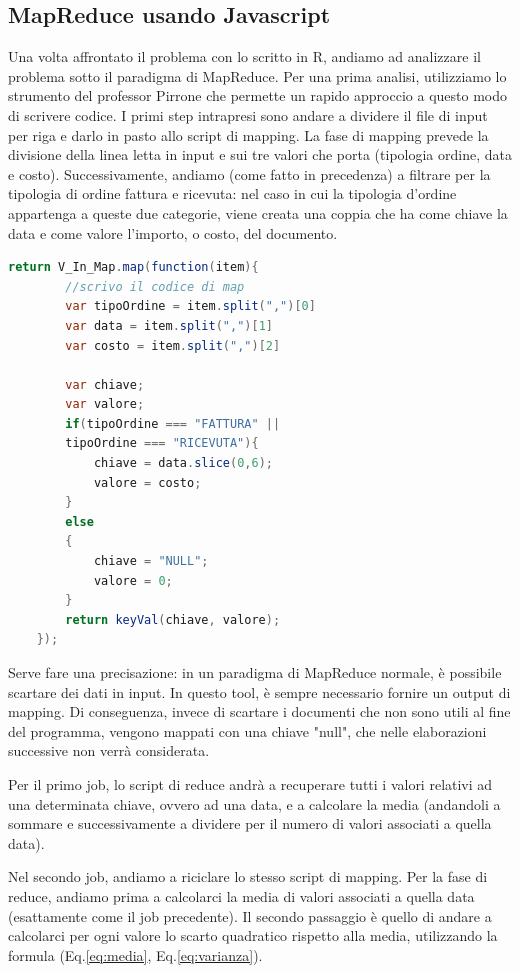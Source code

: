 \subsection{MapReduce usando Javascript}
Una volta affrontato il problema con lo scritto in R, andiamo ad analizzare il problema sotto il paradigma di MapReduce. Per una prima analisi, utilizziamo lo strumento del professor Pirrone che permette un rapido approccio a questo modo di scrivere codice. I primi step intrapresi sono andare a dividere il file di input per riga e darlo in pasto allo script di mapping.
La fase di mapping prevede la divisione della linea letta in input e sui tre valori che porta (tipologia ordine, data e costo). Successivamente, andiamo (come fatto in precedenza) a filtrare per la tipologia di ordine fattura e ricevuta: nel caso in cui la tipologia d'ordine appartenga a queste due categorie, viene creata una coppia che ha come chiave la data e come valore l'importo, o costo, del documento.


\begin{lstlisting}[language=Java, caption={Script di mapping}]
    return V_In_Map.map(function(item){
        //scrivo il codice di map
        var tipoOrdine = item.split(",")[0]
        var data = item.split(",")[1]
        var costo = item.split(",")[2]

        var chiave;
        var valore;
        if(tipoOrdine === "FATTURA" ||
        tipoOrdine === "RICEVUTA"){
            chiave = data.slice(0,6);
            valore = costo;
        }
        else
        {
            chiave = "NULL";
            valore = 0;
        }
        return keyVal(chiave, valore);
    });

\end{lstlisting}
Serve fare una precisazione: in un paradigma di MapReduce normale, è possibile scartare dei dati in input. In questo tool, è sempre necessario fornire un output di mapping. Di conseguenza, invece di scartare i documenti che non sono utili al fine del programma, vengono mappati con una chiave "null", che nelle elaborazioni successive non verrà considerata.

Per il primo job, lo script di reduce andrà a recuperare tutti i valori relativi ad una determinata chiave, ovvero ad una data, e a calcolare la media (andandoli a sommare e successivamente a dividere per il numero di valori associati a quella data).

Nel secondo job, andiamo a riciclare lo stesso script di mapping. Per la fase di reduce, andiamo prima a calcolarci la media di valori associati a quella data (esattamente come il job precedente). Il secondo passaggio è quello di andare a calcolarci per ogni valore lo scarto quadratico rispetto alla media, utilizzando la formula (Eq.\ref{eq:media}, Eq.\ref{eq:varianza}).